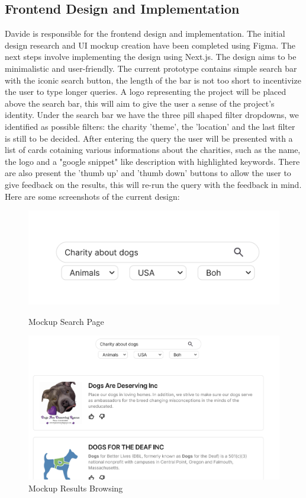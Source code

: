 \documentclass[unicode,9pt,a4paper,oneside,numbers=endperiod,openany]{scrartcl}
\begin{document}
\subsection{Frontend Design and Implementation}
Davide is responsible for the frontend design and implementation. The initial design research and UI mockup creation have been completed using Figma. The next steps involve implementing the design using Next.js.
The design aims to be minimalistic and user-friendly.
The current prototype contains simple search bar with the iconic search button, the length of the bar is not too short to incentivize the user to type longer queries.
A logo representing the project will be placed above the search bar, this will aim to give the user a sense of the project's identity.
Under the search bar we have the three pill shaped filter dropdowns, we identified as possible filters: the charity 'theme', the 'location' and the last filter is still to be decided.
After entering the query the user will be presented with a list of cards cotaining various informations about the charities, such as the name, the logo and a "google snippet" like description with highlighted keywords.
There are also present the 'thumb up' and 'thumb down' buttons to allow the user to give feedback on the results, this will re-run the query with the feedback in mind.
\\Here are some screenshots of the current design:
\begin{figure}[h]
    \centering
    \begin{minipage}{0.45\textwidth}
        \centering
        \includegraphics[width=\textwidth]{fig/mockup1.png}
        \caption{Mockup Search Page}
    \end{minipage}\hfill
    \begin{minipage}{0.45\textwidth}
        \centering
        \includegraphics[width=\textwidth]{fig/mockup2.png}
        \caption{Mockup Results Browsing}
    \end{minipage}
\end{figure}
\end{document}
